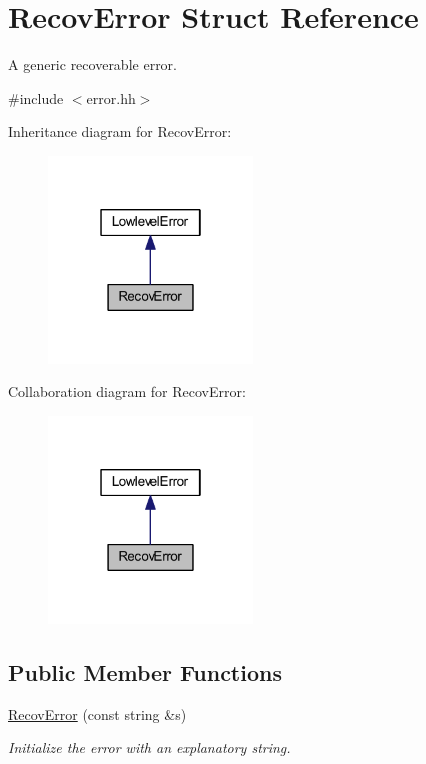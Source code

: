 \hypertarget{struct_recov_error}{}\section{Recov\+Error Struct Reference}
\label{struct_recov_error}


A generic recoverable error.  




{\ttfamily \#include $<$error.\+hh$>$}



Inheritance diagram for Recov\+Error\+:
\nopagebreak
\begin{figure}[H]
\begin{center}
\leavevmode
\includegraphics[width=154pt]{struct_recov_error__inherit__graph}
\end{center}
\end{figure}


Collaboration diagram for Recov\+Error\+:
\nopagebreak
\begin{figure}[H]
\begin{center}
\leavevmode
\includegraphics[width=154pt]{struct_recov_error__coll__graph}
\end{center}
\end{figure}
\subsection*{Public Member Functions}
\begin{DoxyCompactItemize}
\item 
\mbox{\hyperlink{struct_recov_error_aa08b4920f9a6aad56c83c813d9ac37f3}{Recov\+Error}} (const string \&s)
\begin{DoxyCompactList}\small\item\em Initialize the error with an explanatory string. \end{DoxyCompactList}\end{DoxyCompactItemize}
